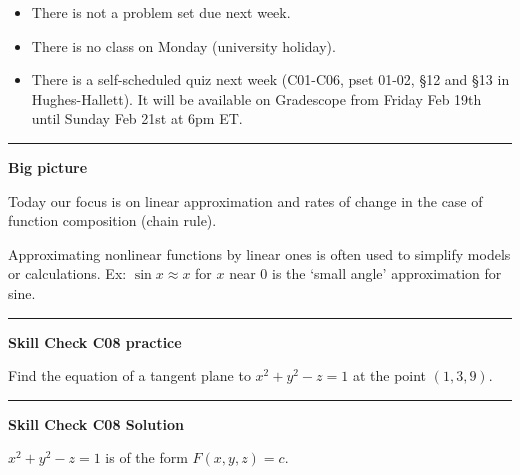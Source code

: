 \documentclass[12pt,letterpaper,noanswers]{exam}
\begin{document}
 \pdfpageheight 11in 
  \pdfpagewidth 8.5in





\begin{itemize}
\itemsep0em
\item There is not a problem set due next week.
\item There is no class on Monday (university holiday).
\item There is a self-scheduled quiz next week (C01-C06, pset 01-02, \S 12 and \S 13 in Hughes-Hallett).  It will be available on Gradescope from Friday Feb 19th until Sunday Feb 21st at 6pm ET.
\end{itemize}

\hrule
\vspace{0.2cm}


\noindent\textbf{Big picture}

Today our focus is on linear approximation and rates of change in the case of function composition (chain rule).  

Approximating nonlinear functions by linear ones is often used to simplify models or calculations.  Ex: $\sin x \approx x$ for $x$ near $0$ is the `small angle' approximation for sine.

\vspace{0.2cm}
\hrule
\vspace{0.2cm}
\noindent\textbf{Skill Check C08 practice}

 Find the equation of a tangent plane to $x^2 +y^2 - z = 1$ at the point $(1,3,9)$.

\vspace{0.2cm}
\hrule
\vspace{0.2cm}

\noindent\textbf{Skill Check C08 Solution}

$x^2 + y^2 - z = 1$ is of the form $F(x,y,z) = c$.
\end{document}
